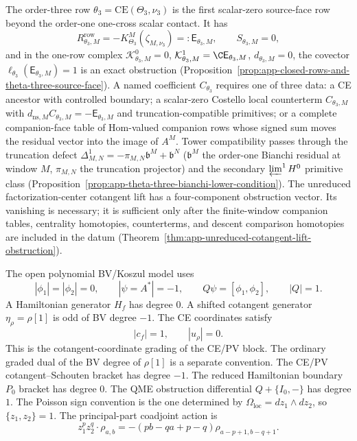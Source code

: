 The order-three row \(\theta_3=\mathrm{CE}(\Theta_3,\nu_3)\) is the
first scalar-zero source-face row beyond the order-one one-cross
scalar contact.  It has
\[
  R^{\mathrm{row}}_{\theta_3,M}
   =-K^M_{\Theta_3}(\zeta_{M,\nu_3})=:\mathsf E_{\theta_3,M},
  \qquad
  S_{\theta_3,M}=0,
\]
and in the one-row complex
\(\mathcal K^0_{\theta_3,M}=0\),
\(\mathcal K^1_{\theta_3,M}=\C\mathsf E_{\theta_3,M}\),
\(d_{\theta_3,M}=0\), the covector
\(\ell_{\theta_3}(\mathsf E_{\theta_3,M})=1\) is an exact obstruction
(Proposition~\ref{prop:app-closed-rows-and-theta-three-source-face}).
A named coefficient \(C_{\theta_3}\) requires one of three data: a CE
ancestor with controlled boundary; a scalar-zero Costello local
counterterm \(C_{\theta_3,M}\) with
\(d_{\mathrm{ns},M}C_{\theta_3,M}=-\mathsf E_{\theta_3,M}\) and
truncation-compatible primitives; or a complete companion-face table
of Hom-valued companion rows whose signed sum moves the residual
vector into the image of \(A^M\).  Tower compatibility passes through the truncation defect
\(\Delta^1_{M,N}=-\pi_{M,N}\mathfrak b^M+\mathfrak b^N\)
(\(\mathfrak b^M\) the order-one Bianchi residual at window \(M\),
\(\pi_{M,N}\) the truncation projector) and the
secondary \(\varprojlim^1H^0\) primitive class
(Proposition~\ref{prop:app-theta-three-bianchi-lower-condition}).
The unreduced factorization-center cotangent lift has a
four-component obstruction vector.  Its vanishing is necessary; it is
sufficient only after the finite-window companion tables, centrality
homotopies, counterterms, and descent comparison homotopies are
included in the datum
(Theorem~\ref{thm:app-unreduced-cotangent-lift-obstruction}).

\begin{defn}
\label{def:app-unreduced-bv-degrees}
  The open polynomial BV/Koszul model uses
  \[
    |\phi_1|=|\phi_2|=0,\qquad |\psi=A^*|=-1,\qquad
    Q\psi=[\phi_1,\phi_2],\qquad |Q|=1 .
  \]
  A Hamiltonian generator \(H_f\) has degree \(0\).  A shifted cotangent
  generator \(\eta_\rho=\rho[1]\) is odd of BV degree \(-1\).  The CE
  coordinates satisfy
  \[
    |c_f|=1,\qquad |u_\rho|=0 .
  \]
  This is the cotangent-coordinate grading of the CE/PV block.  The
  ordinary graded dual of the BV degree of \(\rho[1]\) is a separate
  convention.  The
  CE/PV cotangent--Schouten bracket has degree \(-1\).  The reduced
  Hamiltonian boundary \(P_0\) bracket has degree \(0\).  The QME
  obstruction differential \(Q+\{I_0,-\}\) has degree \(1\).  The
  Poisson sign convention is the one determined by
  \(\Omega_{\mathrm{loc}}=dz_1\wedge dz_2\), so
  \(\{z_1,z_2\}=1\).  The principal-part coadjoint action is
  \[
    z_1^p z_2^q\cdot\rho_{a,b}
    =
    -(pb-qa+p-q)\rho_{a-p+1,b-q+1}.
  \]
\end{defn}

